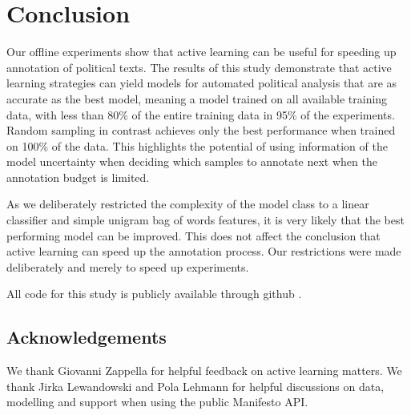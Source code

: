 \documentclass[runningheads,a4paper]{article}
\begin{document}
\section{Conclusion}
Our offline experiments show that active learning can be useful for speeding up annotation of political texts. The results of this study demonstrate that active learning strategies can yield models for automated political analysis that are as accurate as the best model, meaning a model trained on all available training data, with less than 80\% of the entire training data in 95\% of the experiments. Random sampling in contrast achieves only the best performance when trained on 100\% of the data. 
This highlights the potential of using information of the model uncertainty when deciding which samples to annotate next when the annotation budget is limited.

As we deliberately restricted the complexity of the model class to a linear classifier and simple unigram bag of words features, it is very likely that the best performing model can be improved. This does not affect the conclusion that active learning can speed up the annotation process. Our restrictions were made deliberately and merely to speed up experiments.

All code for this study is publicly available through github \cite{active-manifesto-github}.


\subsection*{Acknowledgements}
We thank Giovanni Zappella for helpful feedback on active learning matters. We thank Jirka Lewandowski and Pola Lehmann for helpful discussions on data, modelling and support when using the public Manifesto API.
%
\small{

 
}
\end{document}

